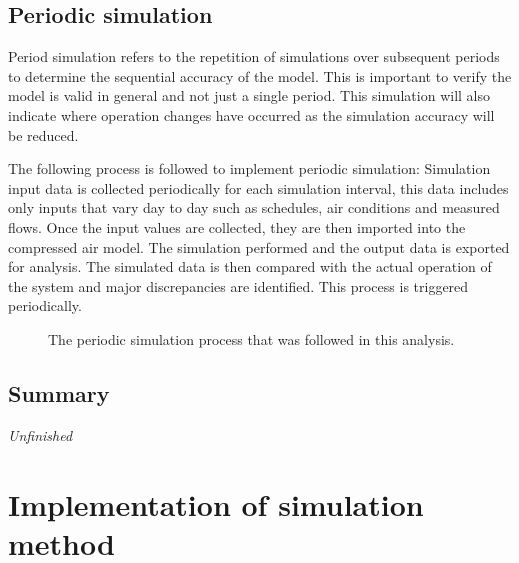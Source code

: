 	\subsection{Periodic simulation}	
		Period simulation refers to the repetition of simulations over subsequent periods to determine the sequential accuracy of the model.  This is important to verify the model is valid in general and not just a single period.  This simulation will also indicate where operation changes have occurred as the simulation accuracy will be reduced.
		\par 
		The following process is followed to implement periodic simulation: Simulation input data is collected periodically for each simulation interval, this data includes only inputs that vary day to day such as schedules, air conditions and  measured flows. Once the input values are collected, they are then imported into the compressed air model. The simulation performed and the output data is exported for analysis. The  simulated data is then compared with the actual operation of the system and major discrepancies are identified. This process is triggered periodically.
		\begin{figure}[h]
			\centering
			\caption{The periodic simulation process that was followed in this analysis.}
			\label{fig: PeriodicProcess}
		\end{figure}
	
	\subsection{Summary}
	\textit{Unfinished}
\newpage
\section{Implementation of simulation method}

